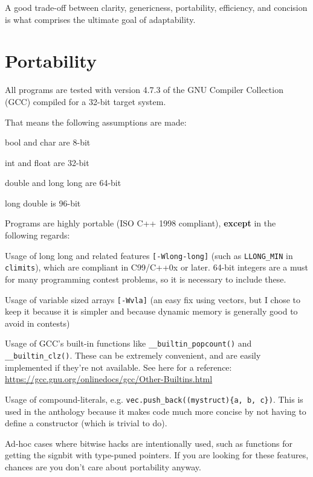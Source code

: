 A good trade-off between clarity, genericness, portability, efficiency, and concision is what comprises the ultimate goal of adaptability.

\section{Portability}

All programs are tested with version 4.7.3 of the GNU Compiler Collection (GCC) compiled for a 32-bit target system.

That means the following assumptions are made:

\begin{compactitem}
	\item bool and char are 8-bit
	\item int and float are 32-bit
	\item double and long long are 64-bit
	\item long double is 96-bit
\end{compactitem}

Programs are highly portable (ISO C++ 1998 compliant), \textbf{except} in the following regards:

\begin{compactitem}
	\item Usage of long long and related features \texttt{[-Wlong-long]} (such as \texttt{LLONG\_MIN} in \texttt{\textlangle{}climits\textrangle{}}), which are compliant in C99/C++0x or later. 64-bit integers are a must for many programming contest problems, so it is necessary to include these.
	\item Usage of variable sized arrays \texttt{[-Wvla]} (an easy fix using vectors, but I chose to keep it because it is simpler and because dynamic memory is generally good to avoid in contests)
	\item Usage of GCC's built-in functions like \texttt{\_\_builtin\_popcount()} and \texttt{\_\_builtin\_clz()}. These can be extremely convenient, and are easily implemented if they're not available. See here for a reference: \url{https://gcc.gnu.org/onlinedocs/gcc/Other-Builtins.html}
	\item Usage of compound-literals, e.g. \texttt{vec.push\_back((mystruct)\{a, b, c\})}. This is used in the anthology because it makes code much more concise by not having to define a constructor (which is trivial to do).
	\item Ad-hoc cases where bitwise hacks are intentionally used, such as functions for getting the signbit with type-puned pointers. If you are looking for these features, chances are you don't care about portability anyway.
\end{compactitem}


